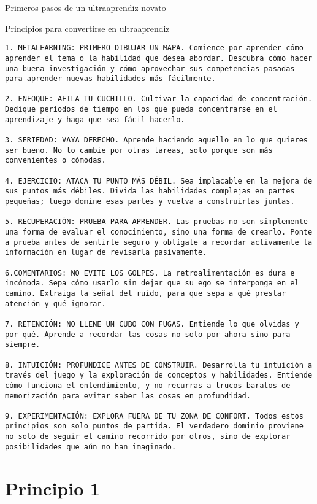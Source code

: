 Primeros pasos de un ultraaprendiz novato


Principios para convertirse en ultraaprendiz


\begin{verbatim}
1. METALEARNING: PRIMERO DIBUJAR UN MAPA. Comience por aprender cómo aprender el tema o la habilidad que desea abordar. Descubra cómo hacer una buena investigación y cómo aprovechar sus competencias pasadas para aprender nuevas habilidades más fácilmente.

2. ENFOQUE: AFILA TU CUCHILLO. Cultivar la capacidad de concentración. Dedique períodos de tiempo en los que pueda concentrarse en el aprendizaje y haga que sea fácil hacerlo.

3. SERIEDAD: VAYA DERECHO. Aprende haciendo aquello en lo que quieres ser bueno. No lo cambie por otras tareas, solo porque son más convenientes o cómodas.

4. EJERCICIO: ATACA TU PUNTO MÁS DÉBIL. Sea implacable en la mejora de sus puntos más débiles. Divida las habilidades complejas en partes pequeñas; luego domine esas partes y vuelva a construirlas juntas.

5. RECUPERACIÓN: PRUEBA PARA APRENDER. Las pruebas no son simplemente una forma de evaluar el conocimiento, sino una forma de crearlo. Ponte a prueba antes de sentirte seguro y oblígate a recordar activamente la información en lugar de revisarla pasivamente.

6.COMENTARIOS: NO EVITE LOS GOLPES. La retroalimentación es dura e incómoda. Sepa cómo usarlo sin dejar que su ego se interponga en el camino. Extraiga la señal del ruido, para que sepa a qué prestar atención y qué ignorar.

7. RETENCIÓN: NO LLENE UN CUBO CON FUGAS. Entiende lo que olvidas y por qué. Aprende a recordar las cosas no solo por ahora sino para siempre.

8. INTUICIÓN: PROFUNDICE ANTES DE CONSTRUIR. Desarrolla tu intuición a través del juego y la exploración de conceptos y habilidades. Entiende cómo funciona el entendimiento, y no recurras a trucos baratos de memorización para evitar saber las cosas en profundidad.

9. EXPERIMENTACIÓN: EXPLORA FUERA DE TU ZONA DE CONFORT. Todos estos principios son solo puntos de partida. El verdadero dominio proviene no solo de seguir el camino recorrido por otros, sino de explorar posibilidades que aún no han imaginado.
\end{verbatim}

\section{Principio 1}

